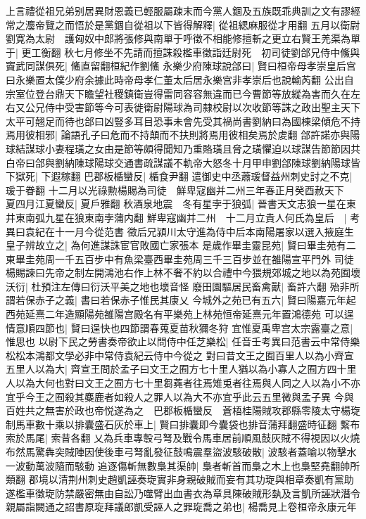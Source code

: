 上言禮從祖兄弟别居異財恩義已輕服屬疎末而今黨人錮及五族既乖典訓之文有謬經常之灋帝覽之而悟於是黨錮自從祖以下皆得解釋|{
	從祖緦麻服從才用翻}
五月以衛尉劉寛為太尉　護匈奴中郎將張修與南單于呼徵不相能修擅斬之更立右賢王羌渠為單于|{
	更工衡翻}
秋七月修坐不先請而擅誅殺檻車徵詣廷尉死　初司徒劉郃兄侍中鯈與竇武同謀俱死|{
	鯈直留翻桓紀作劉鯈}
永樂少府陳球說郃曰|{
	賢曰桓帝母孝崇皇后宫曰永樂置太僕少府余據此時帝母孝仁董太后居永樂宫非孝崇后也說輸芮翻}
公出自宗室位登台鼎天下瞻望社稷鎮衛豈得雷同容容無違而已今曹節等放縱為害而久在左右又公兄侍中受害節等今可表徙衛尉陽球為司隸校尉以次收節等誅之政出聖主天下太平可翹足而待也郃曰凶豎多耳目恐事未會先受其禍尚書劉納曰為國棟梁傾危不持焉用彼相邪|{
	論語孔子曰危而不持顛而不扶則將焉用彼相矣焉於䖍翻}
郃許諾亦與陽球結謀球小妻程璜之女由是節等頗得聞知乃重賂璜且脅之璜懼迫以球謀告節節因共白帝曰郃與劉納陳球陽球交通書疏謀議不軌帝大怒冬十月甲申劉郃陳球劉納陽球皆下獄死|{
	下遐稼翻}
巴郡板楯蠻反|{
	楯食尹翻}
遣御史中丞蕭瑗督益州刺史討之不克|{
	瑗于眷翻}
十二月以光祿勲楊賜為司徒　鮮卑寇幽并二州三年春正月癸酉赦天下　夏四月江夏蠻反|{
	夏戶雅翻}
秋酒泉地震　冬有星孛于狼弧|{
	晉書天文志狼一星在東井東南弧九星在狼東南孛蒲内翻}
鮮卑寇幽并二州　十二月立貴人何氏為皇后　|{
	考異曰袁紀在十一月今從范書}
徵后兄潁川太守進為侍中后本南陽屠家以選入掖庭生皇子辨故立之|{
	為何進謀誅宦官敗國亡家張本}
是歲作畢圭靈昆苑|{
	賢曰畢圭苑有二東畢圭苑周一千五百步中有魚梁臺西畢圭苑周三千三百步並在雒陽宣平門外}
司徒楊賜諫曰先帝之制左開鴻池右作上林不奢不約以合禮中今猥規郊城之地以為苑囿壞沃衍|{
	杜預注左傳曰衍沃平美之地也壞音怪}
廢田園驅居民畜禽獸|{
	畜許六翻}
殆非所謂若保赤子之義|{
	書曰若保赤子惟民其康乂}
今城外之苑已有五六|{
	賢曰陽嘉元年起西苑延熹二年造顯陽苑雒陽宫殿名有平樂苑上林苑恒帝延熹元年置鴻德苑}
可以逞情意順四節也|{
	賢曰逞快也四節謂春蒐夏苗秋獮冬狩}
宜惟夏禹卑宫太宗露臺之意|{
	惟思也}
以尉下民之勞書奏帝欲止以問侍中任芝樂松|{
	任音壬考異曰范書云中常侍樂松松本鴻都文學必非中常侍袁紀云侍中今從之}
對曰昔文王之囿百里人以為小齊宣五里人以為大|{
	齊宣王問於孟子曰文王之囿方七十里人猶以為小寡人之囿方四十里人以為大何也對曰文王之囿方七十里芻蕘者往焉雉兎者往焉與人同之人以為小不亦宜乎今王之囿殺其麋鹿者如殺人之罪人以為大不亦宜乎此云五里微與孟子異}
今與百姓共之無害於政也帝悦遂為之　巴郡板楯蠻反　蒼梧桂陽賊攻郡縣零陵太守楊琁制馬車數十乘以排囊盛石灰於車上|{
	賢曰排囊即今囊袋也排音蒲拜翻盛時征翻}
繫布索於馬尾|{
	索昔各翻}
乂為兵車專彀弓弩及戰令馬車居前順風鼓灰賊不得視因以火燒布然馬驚犇突賊陣因使後車弓弩亂發征鼓鳴震羣盜波駭破散|{
	波駭者蓋喻以物擊水一波動萬波隨而駭動}
追逐傷斬無數梟其渠帥|{
	梟者斬首而梟之木上也梟堅堯翻帥所類翻}
郡境以清荆州刺史趙凱誣奏琁實非身親破賊而妄有其功琁與相章奏凱有黨助遂檻車徵琁防禁嚴密無由自訟乃噬臂出血書衣為章具陳破賊形埶及言凱所誣狀潛令親屬詣闕通之詔書原琁拜議郎凱受誣人之罪琁喬之弟也|{
	楊喬見上卷桓帝永康元年}


